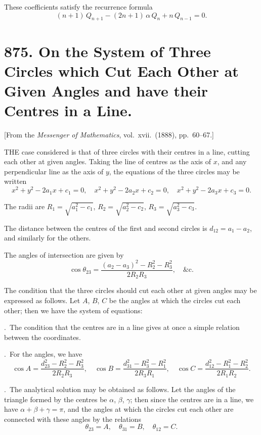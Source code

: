 \documentclass[12pt,a4paper]{article}
\theoremstyle{plain}
\begin{document}
These coefficients satisfy the recurrence formula
\[
(n+1)\,Q_{n+1} - (2n+1)\,\alpha\,Q_{n} + n\,Q_{n-1} = 0.
\]

\newpage
\section[875]{875. On the System of Three Circles which Cut Each Other at Given Angles and have their Centres in a Line.}
\label{sec:875}

[From the \textit{Messenger of Mathematics}, vol.\ xvii.\ (1888), pp.\ 60--67.]

\medskip\noindent
THE case considered is that of three circles with their centres in a line, cutting each other at given angles. Taking the line of centres as the axis of $x$, and any perpendicular line as the axis of $y$, the equations of the three circles may be written
\[
x^{2} + y^{2} - 2a_{1}x + c_{1} = 0, \quad
x^{2} + y^{2} - 2a_{2}x + c_{2} = 0, \quad
x^{2} + y^{2} - 2a_{3}x + c_{3} = 0.
\]

The radii are $R_{1} = \sqrt{a_{1}^{2} - c_{1}}$, $R_{2} = \sqrt{a_{2}^{2} - c_{2}}$, $R_{3} = \sqrt{a_{3}^{2} - c_{3}}$.

The distance between the centres of the first and second circles is $d_{12} = a_{1} - a_{2}$, and similarly for the others.

The angles of intersection are given by
\[
\cos \theta_{23} = \frac{(a_{2} - a_{3})^{2} - R_{2}^{2} - R_{3}^{2}}{2R_{2}R_{3}}, \quad \&\text{c.}
\]

\medskip\noindent
The condition that the three circles should cut each other at given angles may be expressed as follows. Let $A$, $B$, $C$ be the angles at which the circles cut each other; then we have the system of equations:

\medskip{}.\ The condition that the centres are in a line gives at once a simple relation between the coordinates.

\medskip{}.\ For the angles, we have
\[
\cos A = \frac{d_{23}^{2} - R_{2}^{2} - R_{3}^{2}}{2R_{2}R_{3}}, \quad
\cos B = \frac{d_{31}^{2} - R_{3}^{2} - R_{1}^{2}}{2R_{3}R_{1}}, \quad
\cos C = \frac{d_{12}^{2} - R_{1}^{2} - R_{2}^{2}}{2R_{1}R_{2}}.
\]

\medskip{}.\ The analytical solution may be obtained as follows. Let the angles of the triangle formed by the centres be $\alpha$, $\beta$, $\gamma$; then since the centres are in a line, we have $\alpha + \beta + \gamma = \pi$, and the angles at which the circles cut each other are connected with these angles by the relations
\[
\theta_{23} = A, \quad \theta_{31} = B, \quad \theta_{12} = C.
\]
\end{document}
